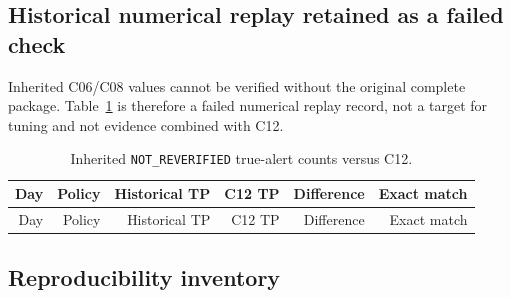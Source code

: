 \subsection{Historical numerical replay retained as a failed check}

Inherited C06/C08 values cannot be verified without the original complete package. Table~\ref{tab:s_history} is therefore a failed numerical replay record, not a target for tuning and not evidence combined with C12.

\small
\begin{longtable}{rrr r r r}
\caption{Inherited \texttt{NOT\_REVERIFIED} true-alert counts versus C12.}\label{tab:s_history}\\
\toprule
Day & Policy & Historical TP & C12 TP & Difference & Exact match \\
\midrule
\endfirsthead
\toprule
Day & Policy & Historical TP & C12 TP & Difference & Exact match \\
\midrule
\endhead

\end{longtable}
\normalsize

\subsection{Reproducibility inventory}


